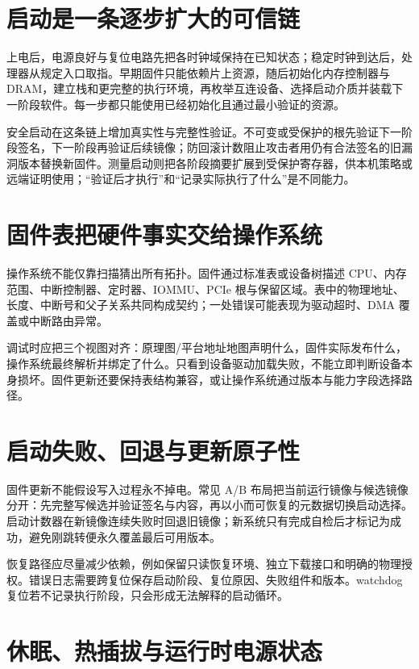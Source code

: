 \section{启动是一条逐步扩大的可信链}

上电后，电源良好与复位电路先把各时钟域保持在已知状态；稳定时钟到达后，处理器从规定入口取指。早期固件只能依赖片上资源，随后初始化内存控制器与 DRAM，建立栈和更完整的执行环境，再枚举互连设备、选择启动介质并装载下一阶段软件。每一步都只能使用已经初始化且通过最小验证的资源。

安全启动在这条链上增加真实性与完整性验证。不可变或受保护的根先验证下一阶段签名，下一阶段再验证后续镜像；防回滚计数阻止攻击者用仍有合法签名的旧漏洞版本替换新固件。测量启动则把各阶段摘要扩展到受保护寄存器，供本机策略或远端证明使用；“验证后才执行”和“记录实际执行了什么”是不同能力。

\section{固件表把硬件事实交给操作系统}

操作系统不能仅靠扫描猜出所有拓扑。固件通过标准表或设备树描述 CPU、内存范围、中断控制器、定时器、IOMMU、PCIe 根与保留区域。表中的物理地址、长度、中断号和父子关系共同构成契约；一处错误可能表现为驱动超时、DMA 覆盖或中断路由异常。

调试时应把三个视图对齐：原理图/平台地址地图声明什么，固件实际发布什么，操作系统最终解析并绑定了什么。只看到设备驱动加载失败，不能立即判断设备本身损坏。固件更新还要保持表结构兼容，或让操作系统通过版本与能力字段选择路径。

\section{启动失败、回退与更新原子性}

固件更新不能假设写入过程永不掉电。常见 A/B 布局把当前运行镜像与候选镜像分开：先完整写候选并验证签名与内容，再以小而可恢复的元数据切换启动选择。启动计数器在新镜像连续失败时回退旧镜像；新系统只有完成自检后才标记为成功，避免刚跳转便永久覆盖最后可用版本。

恢复路径应尽量减少依赖，例如保留只读恢复环境、独立下载接口和明确的物理授权。错误日志需要跨复位保存启动阶段、复位原因、失败组件和版本。watchdog 复位若不记录执行阶段，只会形成无法解释的启动循环。

\section{休眠、热插拔与运行时电源状态}

